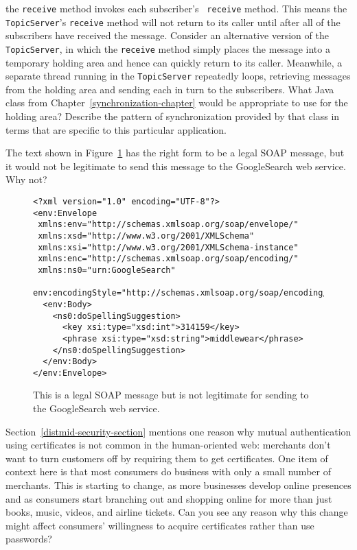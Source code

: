 \begin{chapterEnumerate}
the {\tt receive} method invokes each subscriber's {\tt
  receive} method.  This means the {\tt TopicServer}'s {\tt receive}
method will not return to its caller until after all of the
subscribers have received the message.  Consider an alternative
version of the {\tt TopicServer}, in which the {\tt receive} method
simply places the message into a temporary holding area and hence
can quickly return to its caller.  Meanwhile, a separate thread
running in the {\tt TopicServer} repeatedly loops, retrieving messages from the holding
area and sending each in turn to the subscribers.  What
Java class from Chapter~\ref{synchronization-chapter} would be appropriate to use
for the holding area?  Describe the pattern of synchronization provided by
that class in terms that are specific to this particular application.
\item
The text shown in Figure~\ref{bogus-SOAP-request} has the right form
to be a legal SOAP message, but it would not be legitimate to send
this message to the GoogleSearch web service.  Why not?
\begin{figure}
\begin{verbatim}
<?xml version="1.0" encoding="UTF-8"?>
<env:Envelope
 xmlns:env="http://schemas.xmlsoap.org/soap/envelope/"
 xmlns:xsd="http://www.w3.org/2001/XMLSchema"
 xmlns:xsi="http://www.w3.org/2001/XMLSchema-instance"
 xmlns:enc="http://schemas.xmlsoap.org/soap/encoding/"
 xmlns:ns0="urn:GoogleSearch"
 env:encodingStyle="http://schemas.xmlsoap.org/soap/encoding/">
  <env:Body>
    <ns0:doSpellingSuggestion>
      <key xsi:type="xsd:int">314159</key>
      <phrase xsi:type="xsd:string">middlewear</phrase>
    </ns0:doSpellingSuggestion>
  </env:Body>
</env:Envelope>
\end{verbatim}
\caption{This is a legal SOAP message but is not legitimate for sending
  to the GoogleSearch web service.}\label{bogus-SOAP-request}
\end{figure}
\item
Section~\ref{distmid-security-section} mentions one reason why mutual
authentication using certificates is not common in the human-oriented
web: merchants don't want to turn customers off by requiring them to
get certificates.  One item of context here is that most consumers
do business with only a small number of merchants.  This is starting
to change, as more businesses develop online presences and as
consumers start branching out and shopping online for more than just
books, music, videos, and airline tickets.  Can you see any reason why
this change might affect consumers' willingness to acquire certificates
rather than use passwords?
\end{chapterEnumerate}

